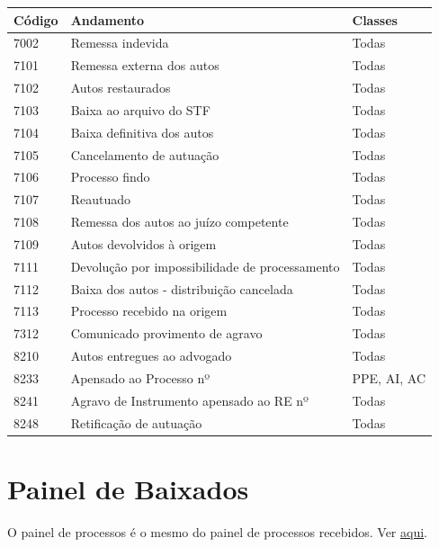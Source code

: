 \documentclass[
]{book}
\begin{document}
\begin{table}[H]
\centering\begingroup\fontsize{14}{16}\selectfont

\begin{tabular}{l|l|l}
\hline
Código & Andamento & Classes\\
\hline
7002 & Remessa indevida & Todas\\
\hline
7101 & Remessa externa dos autos & Todas\\
\hline
7102 & Autos restaurados & Todas\\
\hline
7103 & Baixa ao arquivo do STF & Todas\\
\hline
7104 & Baixa definitiva dos autos & Todas\\
\hline
7105 & Cancelamento de autuação & Todas\\
\hline
7106 & Processo findo & Todas\\
\hline
7107 & Reautuado & Todas\\
\hline
7108 & Remessa dos autos ao juízo competente & Todas\\
\hline
7109 & Autos devolvidos à origem & Todas\\
\hline
7111 & Devolução por impossibilidade de processamento & Todas\\
\hline
7112 & Baixa dos autos - distribuição cancelada & Todas\\
\hline
7113 & Processo recebido na origem & Todas\\
\hline
7312 & Comunicado provimento de agravo & Todas\\
\hline
8210 & Autos entregues ao advogado & Todas\\
\hline
8233 & Apensado ao Processo nº & PPE, AI, AC\\
\hline
8241 & Agravo de Instrumento apensado ao RE nº & Todas\\
\hline
8248 & Retificação de autuação & Todas\\
\hline
\end{tabular}
\endgroup{}
\end{table}

\hypertarget{painel-de-baixados}{%
\section{Painel de Baixados}\label{painel-de-baixados}}

O painel de processos é o mesmo do painel de processos recebidos. Ver \href{https://euleralencar.gitbook.io/glossario-estatistico-bk_2021_11_26/dimensoes/recebimento/painel-de-recebimento}{aqui}.
\end{document}
